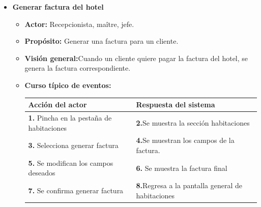 \documentclass[spanish,a4paper,12pt]{report}		%
\begin{document}
\begin{itemize}
	\item \textbf{Generar factura del hotel}
		\begin{itemize}
			\item \textbf{Actor:} Recepcionista, maître, jefe.
			\item \textbf{Propósito: } Generar una factura para un cliente.
			\item \textbf{Visión general:}Cuando un cliente quiere pagar la factura del hotel, se genera la factura correspondiente.
			\item \textbf{Curso típico de eventos:} 	\\
				\begin{tabular}{|p{6cm}||p{6cm}|}
				\hline
				\textbf{Acción del actor} & \textbf{Respuesta del sistema} \\ \hline
				\textbf{1.} Pincha en la pestaña de habitaciones & \textbf{2.}Se muestra la sección habitaciones \\ \hline 
				\textbf{3.} Selecciona generar factura & \textbf{4.}Se muestran los campos de la factura.  \\ \hline
				\textbf{5.} Se modifican los campos deseados & \textbf{6.} Se muestra la factura final \\ \hline
				\textbf{7.} Se confirma generar factura & \textbf{8.}Regresa a la pantalla general de habitaciones\\ \hline
			\end{tabular}
			\\
		\end {itemize}

	\end{itemize}%

\end{document}
